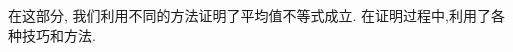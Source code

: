 在这部分, 我们利用不同的方法证明了平均值不等式成立. 在证明过程中,利用了各种技巧和方法.
\begin{comment}
\section*{习 题 1}
$\square$ 设 $a, b, c>0, a b c=1$. 求证：
$$
\frac{1}{a}+\frac{1}{b}+\frac{1}{c} \geqslant \sqrt{a}+\sqrt{b}+\sqrt{c}
$$

22 设 $a, b, c \geqslant 0, a+b+c>0$, 求证: $\frac{(a+b)^{3}(b+c)^{2}(c+a)}{(a+b+c)^{6}} \leqslant \frac{4}{27}$, 并指\\
出等号成立的条件.

3 已知 $0<a, b, c<1$, 并且 $a b+b c+c a=1$. 证明:
$$
\frac{a}{1-a^{2}}+\frac{b}{1-b^{2}}+\frac{c}{1-c^{2}} \geqslant \frac{3 \sqrt{3}}{2}
$$

4设 $a, b, c, d \in \mathbf{R}_{+}$满足 $a b c d=1, a+b+c+d>\frac{a}{b}+\frac{b}{c}+\frac{c}{d}+\frac{d}{a}$.

求证: $a+b+c+d<\frac{b}{a}+\frac{c}{b}+\frac{d}{c}+\frac{a}{d}$.

5 设 $a_{i}>0,1 \leqslant i \leqslant n$. 求证: $\sum_{i=1}^{n} \frac{a_{i}^{3}+a_{i+1}^{3}}{a_{i}^{2}+a_{i} a_{i+1}+a_{i+1}^{2}} \geqslant \frac{2}{3} \sum_{i=1}^{n} a_{i}$, 其中, $a_{n+1}=$ $a_{1}$.

6 设 $a_{1}, a_{2}, \cdots, a_{n}>0$ 且 $a_{1}+a_{2}+\cdots+a_{n}=1$. 求证:
$$
\left(\frac{1}{a_{1}^{2}}-1\right)\left(\frac{1}{a_{2}^{2}}-1\right) \cdots\left(\frac{1}{a_{n}^{2}}-1\right) \geqslant\left(n^{2}-1\right)^{n}
$$

7 设 $a, b, c, d>0$, 满足 $a^{2}+b^{2}+c^{2}+d^{2}=1$. 求证:
$$
a+b+c+d+\frac{1}{a b c d} \geqslant 18
$$

8 设 $x_{i} \geqslant 0,1 \leqslant i \leqslant n, n \geqslant 3$ 满足 $x_{1}+\cdots+x_{n}=1$, 求证:
$$
\frac{3}{4} \leqslant \frac{x_{1}^{2}+x_{2}+\cdots+x_{n-1}+x_{n}}{x_{1}+x_{2}+\cdots+x_{n-1}+x_{n}^{2}} \leqslant \frac{4}{3}
$$

9 设 $x_{1}, x_{2}, \cdots, x_{n}>0$, 且 $x_{1} x_{2} \cdots x_{n}=1$. 求证:
$$
\frac{1}{x_{1}\left(1+x_{1}\right)}+\frac{1}{x_{2}\left(1+x_{2}\right)}+\cdots+\frac{1}{x_{n}\left(1+x_{n}\right)} \geqslant \frac{n}{2}
$$

10 设 $a, b, c>0$ 且 $a^{2}+b^{2}+c^{2}+(a+b+c)^{2} \leqslant 4$. 求证:
$$
\frac{a b+1}{(a+b)^{2}}+\frac{b c+1}{(b+c)^{2}}+\frac{c a+1}{(c+a)^{2}} \geqslant 3
$$

11 已知 $a 、 b 、 c$ 为正实数, 且 $a b c=8$, 求证:
$$
\frac{a^{2}}{\sqrt{\left(1+a^{3}\right)\left(1+b^{3}\right)}}+\frac{b^{2}}{\sqrt{\left(1+b^{3}\right)\left(1+c^{3}\right)}}+\frac{c^{2}}{\sqrt{\left(1+c^{3}\right)\left(1+a^{3}\right)}} \geqslant \frac{4}{3}
$$


\end{comment}

